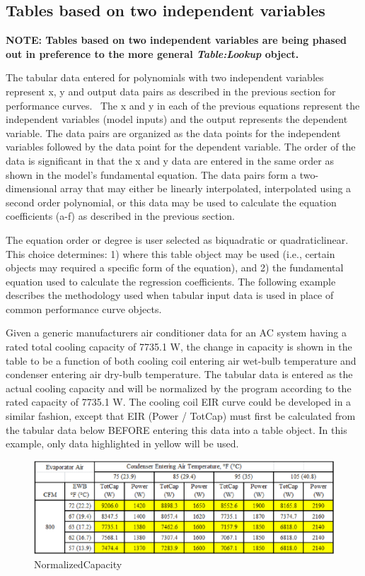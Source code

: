 \subsection{Tables based on two independent variables}\label{tables-based-on-two-independent-variables}

\textbf{NOTE: Tables based on two independent variables are being phased out in preference to the more general \emph{Table:Lookup} object.}

The tabular data entered for polynomials with two independent variables represent x, y and output data pairs as described in the previous section for performance curves.~ The x and y in each of the previous equations represent the independent variables (model inputs) and the output represents the dependent variable. The data pairs are organized as the data points for the independent variables followed by the data point for the dependent variable. The order of the data is significant in that the x and y data are entered in the same order as shown in the model's fundamental equation. The data pairs form a two-dimensional array that may either be linearly interpolated, interpolated using a second order polynomial, or this data may be used to calculate the equation coefficients (a-f) as described in the previous section.

The equation order or degree is user selected as biquadratic or quadraticlinear. This choice determines: 1) where this table object may be used (i.e., certain objects may required a specific form of the equation), and 2) the fundamental equation used to calculate the regression coefficients. The following example describes the methodology used when tabular input data is used in place of common performance curve objects.

Given a generic manufacturers air conditioner data for an AC system having a rated total cooling capacity of 7735.1 W, the change in capacity is shown in the table to be a function of both cooling coil entering air wet-bulb temperature and condenser entering air dry-bulb temperature. The tabular data is entered as the actual cooling capacity and will be normalized by the program according to the rated capacity of 7735.1 W. The cooling coil EIR curve could be developed in a similar fashion, except that EIR (Power / TotCap) must first be calculated from the tabular data below BEFORE entering this data into a table object. In this example, only data highlighted in yellow will be used.

\begin{figure}[htbp]
\centering
\includegraphics{media/image7871.png}
\caption{NormalizedCapacity}
\end{figure}

